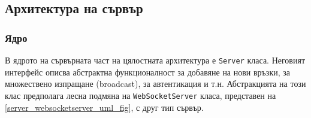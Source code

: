 \documentclass[12pt,a4paper,oneside]{book}
\begin{document}
\subsection{Архитектура на сървър}

\subsubsection{Ядро}

В ядрото на сървърната част на цялостната архитектура е \texttt{Server} класа.
Неговият интерфейс описва абстрактна функционалност за добавяне на нови връзки,
за множествено изпращане (broadcast), за автентикация и т.н. Абстракцията на
този клас предполага лесна подмяна на \texttt{WebSocketServer} класа, представен
на \autoref{server_websocketserver_uml_fig}, с друг тип
сървър.
\end{document}
